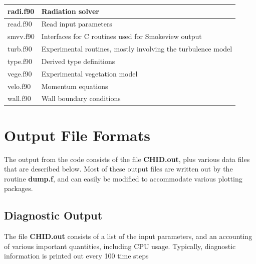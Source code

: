 \documentclass[11pt]{book}
\begin{document}
\begin{table}[ht]
\begin{center}
\begin{tabular}{|l|l|}
radi.f90   & Radiation solver  \\ \hline
read.f90   & Read input parameters \\ \hline
smvv.f90   & Interfaces for C routines used for Smokeview output \\ \hline
turb.f90   & Experimental routines, mostly involving the turbulence model \\ \hline
type.f90   & Derived type definitions \\ \hline
vege.f90   & Experimental vegetation model \\ \hline
velo.f90   & Momentum equations \\ \hline
wall.f90   & Wall boundary conditions \\ \hline
\end{tabular}
\end{center}
\end{table}





\chapter{Output File Formats}

The output from the code consists of the file {\bf CHID.out}, plus various
data files that are described below.
Most of these output files are written out by the routine {\bf dump.f},
and can easily be modified to accommodate various plotting packages.

\section{Diagnostic Output}%

\label{out:file}

The file {\bf CHID.out} consists of a list of the input
parameters, and an accounting of various important quantities, including
CPU usage. Typically, diagnostic information is printed out every
100 time steps
\end{document}
